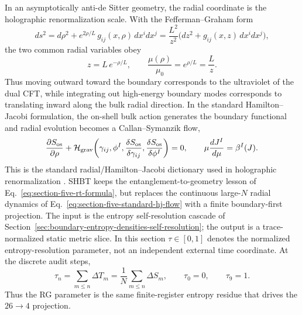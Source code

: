 \documentclass[11pt]{article}
\newcommand{\Nbits}{N}
\begin{document}
In an asymptotically anti-de Sitter geometry, the radial coordinate is the
holographic renormalization scale.  With the Fefferman--Graham form
\cite{fefferman1985}
\begin{equation}
\label{eq:section-five-fg-radial-coordinate}
 ds^2
 =
 d\rho^2
 +
 e^{2\rho/L}\,g_{ij}(x,\rho)\,dx^i dx^j
 =
 \frac{L^2}{z^2}
 \bigl(dz^2+g_{ij}(x,z)\,dx^i dx^j\bigr),
\end{equation}
the two common radial variables obey
\begin{equation}
\label{eq:section-five-radial-scale-map}
 z=L\,e^{-\rho/L},
 \qquad
 \frac{\mu(\rho)}{\mu_0}=e^{\rho/L}=\frac{L}{z}.
\end{equation}
Thus moving outward toward the boundary corresponds to the ultraviolet of the
dual CFT, while integrating out high-energy boundary modes corresponds to
translating inward along the bulk radial direction.  In the standard
Hamilton--Jacobi formulation, the on-shell bulk action generates the boundary
functional and radial evolution becomes a Callan--Symanzik flow,
\begin{equation}
\label{eq:section-five-standard-hj-flow}
 \frac{\partial S_{\rm os}}{\partial\rho}
 +
 \mathcal H_{\rm grav}
 \!\left(
 \gamma_{ij},\phi^I,
 \frac{\delta S_{\rm os}}{\delta\gamma_{ij}},
 \frac{\delta S_{\rm os}}{\delta\phi^I}
 \right)
 =
 0,
 \qquad
 \mu\frac{dJ^I}{d\mu}=\beta^I(J).
\end{equation}
This is the standard radial/Hamilton--Jacobi dictionary used in holographic
renormalization \cite{deboer2000,skenderis2002}.
SHBT keeps the entanglement-to-geometry lesson of
Eq.~\eqref{eq:section-five-rt-formula}, but replaces the continuous large-$N$
radial dynamics of Eq.~\eqref{eq:section-five-standard-hj-flow} with a finite
boundary-first projection.  The input is the entropy self-resolution cascade of
Section~\ref{sec:boundary-entropy-densities-self-resolution}; the output is a
trace-normalized static metric slice.  In this section $\tau\in[0,1]$ denotes
the normalized entropy-resolution parameter, not an independent external time
coordinate.  At the discrete audit steps,
\begin{equation}
\label{eq:section-five-rg-time}
 \tau_n=
 \sum_{m\le n}\Delta T_m
 =
 \frac{1}{\Nbits}
 \sum_{m\le n}\Delta S_m,
 \qquad
 \tau_0=0,
 \qquad
 \tau_9=1.
\end{equation}
Thus the RG parameter is the same finite-register entropy residue that drives
the $26\to4$ projection.
\end{document}
